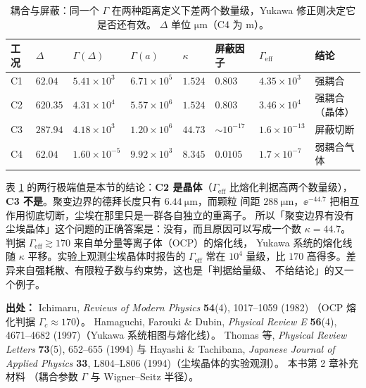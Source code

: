 \begin{table}[htbp]
  \centering
  \caption{耦合与屏蔽：同一个 $\Gamma$ 在两种距离定义下差两个数量级，Yukawa 修正则决定它是否还有效。
    $\Delta$ 单位 $\mathrm{\mu m}$（C4 为 m）。}
  \label{tab:app-r-gamma}
  \begin{tabular}{@{}p{2.1cm}p{1.9cm}p{1.8cm}p{1.8cm}p{1.3cm}p{1.6cm}p{1.9cm}p{2.3cm}@{}}
    \toprule
    工况 & $\Delta$ & $\Gamma(\Delta)$ & $\Gamma(a)$ & $\kappa$ & 屏蔽因子 & $\Gamma_{\mathrm{eff}}$ & 结论 \\
    \midrule
    C1 & $62.04$ & $5.41\times10^{3}$ & $6.71\times10^{5}$ & $1.524$ & $0.803$ & $4.35\times10^{3}$ & 强耦合 \\
    C2 & $620.35$ & $4.31\times10^{4}$ & $5.57\times10^{6}$ & $1.524$ & $0.803$ & $3.46\times10^{4}$ & 强耦合（晶体） \\
    C3 & $287.94$ & $4.18\times10^{3}$ & $1.20\times10^{6}$ & $44.73$ & $\sim10^{-17}$ & $1.6\times10^{-13}$ & 屏蔽切断 \\
    C4 & $62.04$ & $1.60\times10^{-5}$ & $9.92\times10^{3}$ & $8.345$ & $0.0105$ & $1.7\times10^{-7}$ & 弱耦合气体 \\
    \bottomrule
  \end{tabular}
\end{table}

表 \ref{tab:app-r-gamma} 的两行极端值是本节的结论：\textbf{C2 是晶体}（$\Gamma_{\mathrm{eff}}$
比熔化判据高两个数量级），\textbf{C3 不是}。聚变边界的德拜长度只有 $6.44\ \mathrm{\mu m}$，而颗粒
间距 $288\ \mathrm{\mu m}$，$\ee^{-44.7}$ 把相互作用彻底切断，尘埃在那里只是一群各自独立的重离子。
所以「聚变边界有没有尘埃晶体」这个问题的正确答案是：没有，而且原因可以写成一个数
$\kappa=44.7$。判据 $\Gamma_{\mathrm{eff}}\gtrsim170$ 来自单分量等离子体（OCP）的熔化线，
Yukawa 系统的熔化线随 $\kappa$ 平移。实验上观测尘埃晶体时报告的 $\Gamma_{\mathrm{eff}}$ 常在
$10^{4}$ 量级，比 $170$ 高得多。差异来自强耗散、有限粒子数与约束势，这也是「判据给量级、
不给结论」的又一个例子。

{\footnotesize
\textbf{出处：} Ichimaru, \emph{Reviews of Modern Physics} \textbf{54}(4), 1017--1059 (1982)
（OCP 熔化判据 $\Gamma_c\approx170$）。
Hamaguchi, Farouki \& Dubin, \emph{Physical Review E}
\textbf{56}(4), 4671--4682 (1997)（Yukawa 系统相图与熔化线）。
Thomas 等, \emph{Physical Review
Letters} \textbf{73}(5), 652--655 (1994) 与 Hayashi \& Tachibana, \emph{Japanese Journal of
Applied Physics} \textbf{33}, L804--L806 (1994)（尘埃晶体的实验观测）。
本书第 2 章补充材料
（耦合参数 $\Gamma$ 与 Wigner--Seitz 半径）。
}

